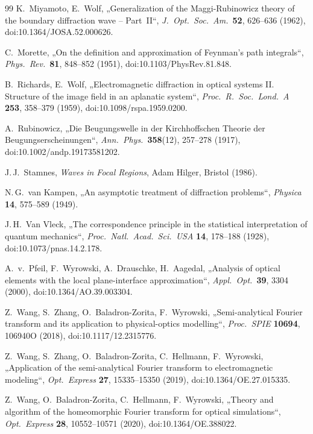 \documentclass[11pt,a4paper]{scrartcl}
\theoremstyle{insightstyle}
\begin{document}
\begin{thebibliography}{99}
 K.~Miyamoto, E.~Wolf, „Generalization of the Maggi-Rubinowicz theory of the boundary diffraction wave -- Part~II“, \emph{J.\ Opt.\ Soc.\ Am.}\ \textbf{52}, 626--636 (1962), doi:10.1364/JOSA.52.000626.

 C.~Morette, „On the definition and approximation of Feynman's path integrals“, \emph{Phys.\ Rev.}\ \textbf{81}, 848--852 (1951), doi:10.1103/PhysRev.81.848.

 B.~Richards, E.~Wolf, „Electromagnetic diffraction in optical systems II. Structure of the image field in an aplanatic system“, \emph{Proc.\ R.\ Soc.\ Lond.\ A} \textbf{253}, 358--379 (1959), doi:10.1098/rspa.1959.0200.

 A.~Rubinowicz, „Die Beugungswelle in der Kirchhoffschen Theorie der Beugungserscheinungen“, \emph{Ann.\ Phys.}\ \textbf{358}(12), 257--278 (1917), doi:10.1002/andp.19173581202.

 J.\,J.~Stamnes, \emph{Waves in Focal Regions}, Adam Hilger, Bristol (1986).

 N.\,G.~van Kampen, „An asymptotic treatment of diffraction problems“, \emph{Physica} \textbf{14}, 575--589 (1949).

 J.\,H.~Van Vleck, „The correspondence principle in the statistical interpretation of quantum mechanics“, \emph{Proc.\ Natl.\ Acad.\ Sci.\ USA} \textbf{14}, 178--188 (1928), doi:10.1073/pnas.14.2.178.

 A.~v.~Pfeil, F.~Wyrowski, A.~Drauschke, H.~Aagedal, „Analysis of optical elements with the local plane-interface approximation“, \emph{Appl.\ Opt.}\ \textbf{39}, 3304 (2000), doi:10.1364/AO.39.003304.

 Z.~Wang, S.~Zhang, O.~Baladron-Zorita, F.~Wyrowski, „Semi-analytical Fourier transform and its application to physical-optics modelling“, \emph{Proc.\ SPIE} \textbf{10694}, 106940O (2018), doi:10.1117/12.2315776.

 Z.~Wang, S.~Zhang, O.~Baladron-Zorita, C.~Hellmann, F.~Wyrowski, „Application of the semi-analytical Fourier transform to electromagnetic modeling“, \emph{Opt.\ Express} \textbf{27}, 15335--15350 (2019), doi:10.1364/OE.27.015335.

 Z.~Wang, O.~Baladron-Zorita, C.~Hellmann, F.~Wyrowski, „Theory and algorithm of the homeomorphic Fourier transform for optical simulations“, \emph{Opt.\ Express} \textbf{28}, 10552--10571 (2020), doi:10.1364/OE.388022.


\end{thebibliography}
\end{document}

